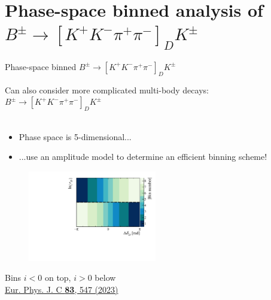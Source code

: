 \documentclass[xcolor={dvipsnames}]{beamer}
\begin{document}
\section{Phase-space binned analysis of \texorpdfstring{$B^\pm\to[K^+K^-\pi^+\pi^-]_DK^\pm$}{B2DKD2KKpipi}}
\begin{frame}{Phase-space binned $B^\pm\to[K^+K^-\pi^+\pi^-]_DK^\pm$}
  \begin{center}
    {\Large Can also consider more complicated multi-body decays: $B^\pm\to[K^+K^-\pi^+\pi^-]_DK^\pm$}\\~\\
  \end{center}
  \vspace{-0.5cm}
  \begin{itemize}
    \setlength\itemsep{0.0em}
    \item{Phase space is 5-dimensional...}
    \item{...use an amplitude model to determine an efficient binning scheme!}
  \end{itemize}
  \vspace{-0.2cm}
  \begin{figure}
    \centering
    \includegraphics[width = 0.5\textwidth]{Plots/BinningSchemePlot_8Bins.pdf}
  \end{figure}
  \vspace{-0.5cm}
  \begin{center}
    Bins $i < 0$ on top, $i > 0$ below\\
    \href{https://link.springer.com/article/10.1140/epjc/s10052-023-11560-5}{Eur. Phys. J. C \textbf{83}, 547 (2023)}
  \end{center}
\end{frame}
\end{document}
